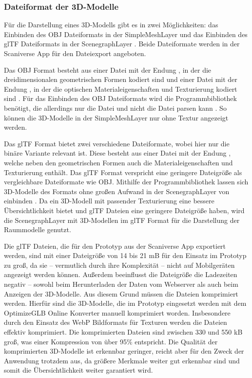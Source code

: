 \subsubsection{Dateiformat der 3D-Modelle}\label{sec:ModelFileFormat}
Für die Darstellung eines 3D-Modells gibt es in \deckgl{} zwei Möglichkeiten: das Einbinden des \ac{OBJ} Dateiformats in der SimpleMeshLayer \cite{DeckglSimpleMeshLayer} und das Einbinden des \ac{glTF} Dateiformats in der ScenegraphLayer \cite{DeckglScenegraphLayer}. Beide Dateiformate werden in der Scaniverse App für den Dateiexport angeboten.

Das \ac{OBJ} Format besteht aus einer Datei mit der Endung \obj{}, in der die dreidimensionalen geometrischen Formen kodiert sind \cite{OBJSpec} und einer Datei mit der Endung \mtl{}, in der die optischen Materialeigenschaften und Texturierung kodiert sind \cite{MTLSpec}. Für das Einbinden des \ac{OBJ} Dateiformats wird die \loadersgl{} Programmbibliothek benötigt, die allerdings nur die \obj{} Datei und nicht die \mtl{} Datei parsen kann \cite{OBJLoader}. So können die 3D-Modelle in der SimpleMeshLayer nur ohne Textur angezeigt werden.

Das \ac{glTF} Format bietet zwei verschiedene Dateiformate, wobei hier nur die binäre Variante relevant ist. Diese besteht aus einer Datei mit der Endung \glb{}, welche neben den geometrischen Formen auch die Materialeigenschaften und Texturierung enthält. Das \ac{glTF} Format verspricht eine geringere Dateigröße als vergleichbare Dateiformate wie \ac{OBJ}.\cite[Abschnitt 2]{glTFSpec} Mithilfe der \loadersgl{} Programmbibliothek lassen sich 3D-Modelle des Formats ohne großen Aufwand in der ScenegraphLayer von \deckgl{} einbinden \cite{DeckglScenegraphLayer}. Da ein 3D-Modell mit passender Texturierung eine bessere Übersichtlichkeit bietet und \ac{glTF} Dateien eine geringere Dateigröße haben, wird die ScenegraphLayer mit 3D-Modellen im \ac{glTF} Format für die Darstellung der Raummodelle genutzt.

Die \ac{glTF} Dateien, die für den Prototyp aus der Scaniverse App exportiert werden, sind mit einer Dateigröße von 14 bis 21 \ac{mB} für den Einsatz im Prototyp zu groß, da sie – vermutlich durch ihre Komplexität – nicht auf Mobilgeräten angezeigt werden können. Außerdem beeinflusst die Dateigröße die Ladezeiten negativ – sowohl beim Herunterladen der Daten vom Webserver als auch beim Anzeigen der 3D-Modelle. Aus diesem Grund müssen die Dateien komprimiert werden. Hierfür sind die 3D-Modelle, die im Prototyp eingesetzt werden mit dem OptimizeGLB Online Konverter \cite{OptimizeGLB} manuell komprimiert worden. Insbesondere durch den Einsatz des \ac{WebP} Bildformats für Texturen werden die Dateien effektiv komprimiert. Die komprimierten Dateien sind zwischen 330 und 550 \ac{kB} groß, was einer Kompression von über 95\% entspricht. Die Qualität der komprimierten 3D-Modelle ist erkennbar geringer, reicht aber für den Zweck der Anwendung trotzdem aus, da größere Merkmale weiter gut erkennbar sind und somit die Übersichtlichkeit weiter garantiert wird.

